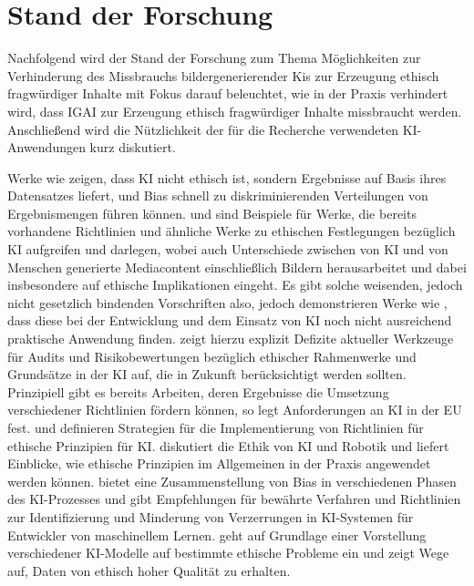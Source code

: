 \chapter{Stand der Forschung}

Nachfolgend wird der Stand der Forschung zum Thema Möglichkeiten zur Verhinderung 
des Missbrauchs bildergenerierender Kis zur Erzeugung ethisch fragwürdiger Inhalte mit Fokus darauf beleuchtet, wie in der Praxis verhindert wird, dass IGAI zur Erzeugung ethisch fragwürdiger Inhalte missbraucht werden. Anschließend wird die Nützlichkeit der für die Recherche verwendeten KI-Anwendungen kurz diskutiert.

Werke wie \cite{Salminen} zeigen, dass KI nicht ethisch ist, sondern Ergebnisse auf Basis ihres Datensatzes liefert,
und Bias schnell zu diskriminierenden Verteilungen von Ergebnismengen führen können. \cite{Jobin} und \cite{Partadiredja}
sind Beispiele für Werke, die bereits vorhandene Richtlinien und ähnliche Werke zu ethischen Festlegungen bezüglich KI 
aufgreifen und darlegen, wobei \cite{Partadiredja} auch Unterschiede zwischen von KI und von Menschen generierte 
Mediacontent einschließlich Bildern herausarbeitet und dabei insbesondere auf ethische Implikationen eingeht. 
Es gibt solche weisenden, jedoch nicht gesetzlich bindenden Vorschriften also, jedoch demonstrieren Werke wie 
\cite{Ayling}, dass diese bei der Entwicklung und dem Einsatz von KI noch nicht ausreichend praktische Anwendung 
finden. \cite{Ayling} zeigt hierzu explizit Defizite aktueller Werkzeuge für Audits und Risikobewertungen bezüglich 
ethischer Rahmenwerke und Grundsätze in der KI auf, die in Zukunft berücksichtigt werden sollten. 
Prinzipiell gibt es bereits Arbeiten, deren Ergebnisse die Umsetzung verschiedener Richtlinien fördern können, so legt 
\cite{EUCommision} Anforderungen an KI in der EU fest. \cite{Jobin} und \cite{Hagendorff} definieren Strategien 
für die Implementierung von Richtlinien für ethische Prinzipien für KI. \cite{Stahl} diskutiert die Ethik von KI und Robotik 
und liefert Einblicke, wie ethische Prinzipien im Allgemeinen in der Praxis angewendet werden können. \cite{Srinivasan} bietet 
eine Zusammenstellung von Bias in verschiedenen Phasen des KI-Prozesses und gibt Empfehlungen für bewährte Verfahren und 
Richtlinien zur Identifizierung und Minderung von Verzerrungen in KI-Systemen für Entwickler von maschinellem Lernen. \cite{Jameel} 
geht auf Grundlage einer Vorstellung verschiedener KI-Modelle auf bestimmte ethische Probleme ein und zeigt Wege auf, 
Daten von ethisch hoher Qualität zu erhalten.
